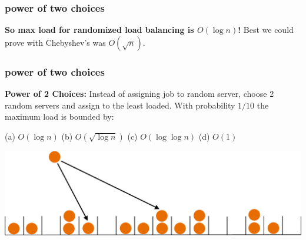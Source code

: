 \documentclass[handout,compress]{beamer}
\begin{document}
\begin{frame}
	\frametitle{power of two choices}
	\begin{center}\alert{\textbf{So max load for randomized load balancing is $O(\log n)$!}} Best we could prove with Chebyshev's was $O(\sqrt{n})$. \end{center}
\end{frame}

\begin{frame}
	\frametitle{power of two choices}
	\textbf{Power of 2 Choices:} Instead of assigning job to random server, choose 2 random servers and assign to the least loaded. With probability $1/10$ the maximum load is bounded by:
	
	(a) $O(\log n)$ \hspace{1em} (b) $O(\sqrt{\log n})$  \hspace{1em}  (c) $O(\log \log n)$  \hspace{1em} (d) $O(1)$
	\begin{center}
		\includegraphics[width=.9\textwidth]{power_of_two.png}
	\end{center}
\end{frame}
\end{document}
